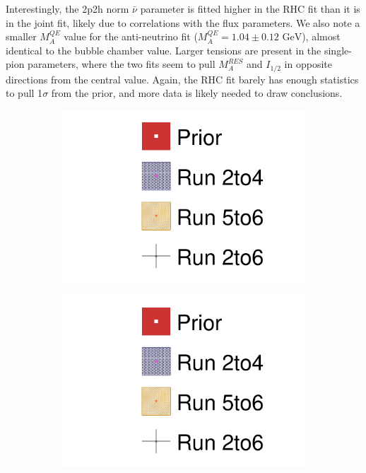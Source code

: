 Interestingly, the 2p2h norm $\bar{\nu}$ parameter is fitted higher in the RHC fit than it is in the joint fit, likely due to correlations with the flux parameters. We also note a smaller $M_A^{QE}$ value for the anti-neutrino fit ($M_A^{QE} = 1.04\pm0.12 \text{ GeV}$), almost identical to the bubble chamber value\cite{maqe_fit}. Larger tensions are present in the single-pion parameters, where the two fits seem to pull $M_A^{RES}$ and $I_{1/2}$ in opposite directions from the central value. Again, the RHC fit barely has enough statistics to pull 1$\sigma$ from the prior, and more data is likely needed to draw conclusions.
\begin{figure}[h]
	\begin{subfigure}[t]{0.49\textwidth}
		\includegraphics[width=\textwidth, trim={0mm 0mm 0mm 0mm}, clip,page=18]{figures/mach3/data/alt/2017b_Run2to4_Data_merge_2017b_Run56_Data_merge_2017b_NewData_NewDet_UpdXsecStep_2Xsec_4Det_5Flux_0}
	\end{subfigure}
	\begin{subfigure}[t]{0.49\textwidth}
		\includegraphics[width=\textwidth, trim={0mm 0mm 0mm 0mm}, clip,page=19]{figures/mach3/data/alt/2017b_Run2to4_Data_merge_2017b_Run56_Data_merge_2017b_NewData_NewDet_UpdXsecStep_2Xsec_4Det_5Flux_0}
	\end{subfigure}
	

\end{figure}
